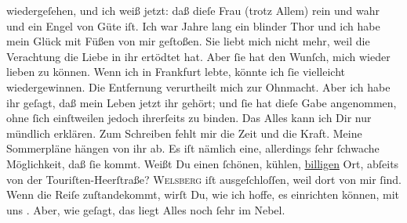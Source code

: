 \begin{ledgroupsized}[t]{13cm}
               wiedergeſehen, und ich weiß jetzt: daß dieſe Frau (trotz Allem) rein und wahr und ein Engel von Güte iſt.
               Ich war Jahre lang ein blinder Thor und ich habe mein Glück mit Füßen von mir
               geſtoßen. Sie liebt mich nicht mehr, weil die Verachtung die Liebe in ihr ertödtet
               hat. Aber ſie hat den Wunſch, mich wieder lieben zu können. Wenn ich in Frankfurt lebte, könnte ich ſie vielleicht
               wiedergewinnen. Die Entfernung verurtheilt mich zur Ohnmacht. Aber ich habe  ihr geſagt, daß mein Leben jetzt ihr gehört; und ſie
               hat dieſe Gabe angenommen, ohne ſich einſtweilen jedoch ihrerſeits zu {\pb}binden. Das Alles kann ich Dir nur mündlich
               erklären. Zum Schreiben fehlt mir die Zeit und die Kraft.\pend
           \pstart
           Meine Sommerpläne hängen von ihr ab. Es iſt nämlich eine, allerdings ſehr ſchwache Möglichkeit, daß ſie
                  \label{K_L03377-2v}\label{K_L03377-2h} kommt. Weißt
               Du einen ſchönen, kühlen, \uline{billigen} Ort, abſeits von
               der Touriſten-Heerſtraße? \textsc{Welsberg} iſt ausgeſchloſſen, weil dort \label{K_L03377-3v}\label{K_L03377-3h}
               von mir ſind. Wenn die Reiſe zuſtandekommt, wirſt Du, wie ich hoffe, es einrichten
               können, mit uns \label{K_L03377-4v}\label{K_L03377-4h}. Aber, wie geſagt, das liegt Alles noch ſehr im Nebel.\pend

\end{ledgroupsized}
